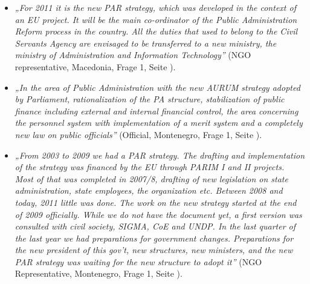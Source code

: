 \begin{itemize}[label={}]
\item \textit{„For 2011 it is the new PAR strategy, which was developed in the context of an EU project. It will be the main co-ordinator of the Public Administration Reform process in the country. All the duties that used to belong to the Civil Servants Agency are envisaged to be transferred to a new ministry, the ministry of Administration and Information Technology”} (NGO representative, Macedonia, Frage 1, Seite \pageref{sec:par macedonia}).
\item \textit{„In the area of Public Administration with the new AURUM strategy adopted by Parliament, rationalization of the PA structure, stabilization of public finance including external and internal financial control, the area concerning the personnel system with implementation of a merit system and a completely new law on public officials”} (Official, Montenegro, Frage 1, Seite \pageref{sec:par macedonia}).
\item \textit{„From 2003 to 2009 we had a PAR strategy. The drafting and implementation of the strategy was financed by the EU through PARIM I and II projects. Most of that was completed in 2007/8, drafting of new legislation on state administration, state employees, the organization etc. Between 2008 and today, 2011 little was done. The work on the new strategy started at the end of 2009 officially. While we do not have the document yet, a first version was consulted with civil society, SIGMA, CoE and UNDP. In the last quarter of the last year we had preparations for government changes. Preparations for the new president of this gov’t, new structures, new ministers, and the new PAR strategy was waiting for the new structure to adopt it”} (NGO Representative, Montenegro, Frage 1, Seite \pageref{sec:par macedonia}).
\end{itemize}


